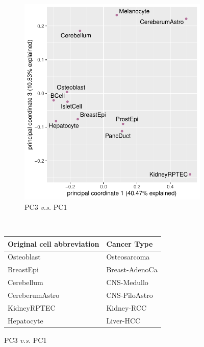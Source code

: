 \begin{figure}[h!]
\begin{minipage}[c]{\textwidth}
\begin{subfigure}{.5\textwidth}
    \includegraphics[scale=0.7]{graphics/encode_pca_1_3.pdf}
    \caption{PC3 \textit{v.s.} PC1}
    \end{subfigure} \\
  \end{minipage}\hfill
  \vspace{1cm}
  
  \begin{minipage}[c]{\textwidth}
    \centering
    \begin{tabulary}{\textwidth}{ ll }
    \toprule
    \textbf{Original cell abbreviation} & \bf{Cancer Type}  \\
    \toprule
    Osteoblast & Osteosarcoma \\
    
    BreastEpi & Breast-AdenoCa \\
    
    Cerebellum &  CNS-Medullo  \\
    
    CereberumAstro & CNS-PiloAstro \\
    
    KidneyRPTEC & Kidney-RCC \\
    
    Hepatocyte & Liver-HCC \\
    

\end{tabulary}
\end{minipage}
\end{figure}
